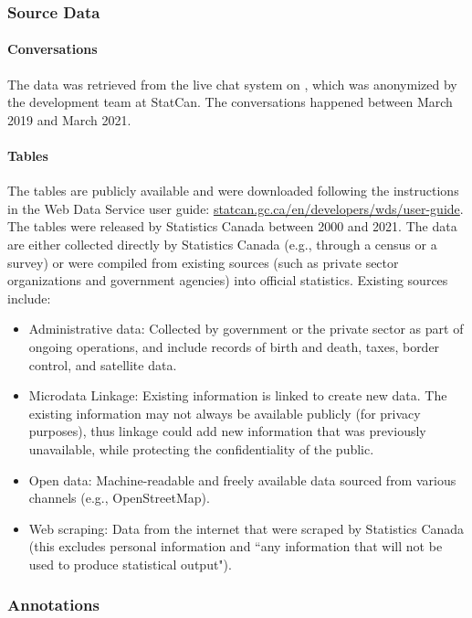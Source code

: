 \documentclass[11pt]{article}
\begin{document}
\subsubsection{Source Data}

\paragraph{Conversations} The data was retrieved from the live chat system on , which was anonymized by the development team at StatCan. The conversations happened between March 2019 and March 2021.

\paragraph{Tables} The tables are publicly available and were downloaded following the instructions in the Web Data Service user guide: \href{https://www.statcan.gc.ca/en/developers/wds/user-guide}{statcan.gc.ca/en/developers/wds/user-guide}. The tables were released by Statistics Canada between 2000 and 2021. The data are either collected directly by Statistics Canada (e.g., through a census or a survey) or were compiled from existing sources (such as private sector organizations and government agencies) into official statistics. Existing sources include:

\begin{itemize}
    \item Administrative data: Collected by government or the private sector as part of ongoing operations, and include records of birth and death, taxes, border control, and satellite data. 
    \item Microdata Linkage: Existing information is linked to create new data. The existing information may not always be available publicly (for privacy purposes), thus linkage could add new information that was previously unavailable, while protecting the confidentiality of the public.
    \item Open data: Machine-readable and freely available data sourced from various channels (e.g., OpenStreetMap).
    \item Web scraping: Data from the internet that were scraped by Statistics Canada (this excludes personal information and ``any information that will not be used to produce statistical output").
\end{itemize}

\subsubsection{Annotations}
\end{document}
